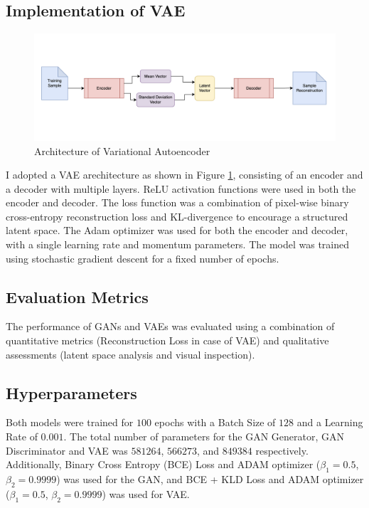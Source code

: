 \documentclass{article}
\begin{document}
\subsection{Implementation of VAE}
\begin{figure}[ht]
\vskip 0.2in
\begin{center}
\centerline{\includegraphics[width=\columnwidth]{images/vae_architecture.png}}
\caption{Architecture of Variational Autoencoder}
\label{vae-architecture}
\end{center}
\vskip -0.2in
\end{figure}
I adopted a VAE arechitecture as shown in Figure \ref{vae-architecture}, consisting of an encoder and a decoder with multiple layers. ReLU activation functions were used in both the encoder and decoder. The loss function was a combination of pixel-wise binary cross-entropy reconstruction loss and KL-divergence to encourage a structured latent space. The Adam optimizer was used for both the encoder and decoder, with a single learning rate and momentum parameters. The model was trained using stochastic gradient descent for a fixed number of epochs.

\subsection{Evaluation Metrics}
The performance of GANs and VAEs was evaluated using a combination of quantitative metrics (Reconstruction Loss in case of VAE) and qualitative assessments (latent space analysis and visual inspection).

\subsection{Hyperparameters}
Both models were trained for $100$ epochs with a Batch Size of $128$ and a Learning Rate of $0.001$. The total number of parameters for the GAN Generator, GAN Discriminator and VAE was $581264$, $566273$, and $849384$ respectively. Additionally, Binary Cross Entropy (BCE) Loss and ADAM optimizer ($\beta_1=0.5$, $\beta_2=0.9999$) was used for the GAN, and BCE + KLD Loss and ADAM optimizer ($\beta_1=0.5$, $\beta_2=0.9999$) was used for VAE.
\end{document}
